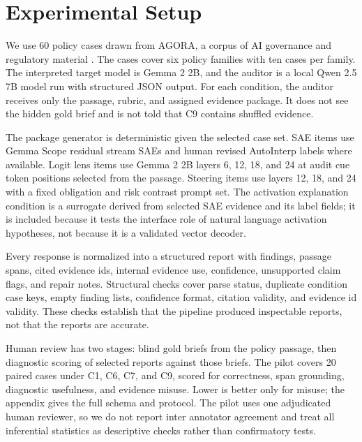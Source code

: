 \documentclass{article}
\begin{document}
\FloatBarrier

\section{Experimental Setup}

We use 60 policy cases drawn from AGORA, a corpus of AI governance and regulatory material \citep{arnold2024agora}. The cases cover six policy families with ten cases per family. The interpreted target model is Gemma 2 2B, and the auditor is a local Qwen 2.5 7B model run with structured JSON output. For each condition, the auditor receives only the passage, rubric, and assigned evidence package. It does not see the hidden gold brief and is not told that C9 contains shuffled evidence.

The package generator is deterministic given the selected case set. SAE items use Gemma Scope residual stream SAEs and human revised AutoInterp labels where available. Logit lens items use Gemma 2 2B layers 6, 12, 18, and 24 at audit cue token positions selected from the passage. Steering items use layers 12, 18, and 24 with a fixed obligation and risk contrast prompt set. The activation explanation condition is a surrogate derived from selected SAE evidence and its label fields; it is included because it tests the interface role of natural language activation hypotheses, not because it is a validated vector decoder.

Every response is normalized into a structured report with findings, passage spans, cited evidence ids, internal evidence use, confidence, unsupported claim flags, and repair notes. Structural checks cover parse status, duplicate condition case keys, empty finding lists, confidence format, citation validity, and evidence id validity. These checks establish that the pipeline produced inspectable reports, not that the reports are accurate.

Human review has two stages: blind gold briefs from the policy passage, then diagnostic scoring of selected reports against those briefs. The pilot covers 20 paired cases under C1, C6, C7, and C9, scored for correctness, span grounding, diagnostic usefulness, and evidence misuse. Lower is better only for misuse; the appendix gives the full schema and protocol. The pilot uses one adjudicated human reviewer, so we do not report inter annotator agreement and treat all inferential statistics as descriptive checks rather than confirmatory tests.
\end{document}
